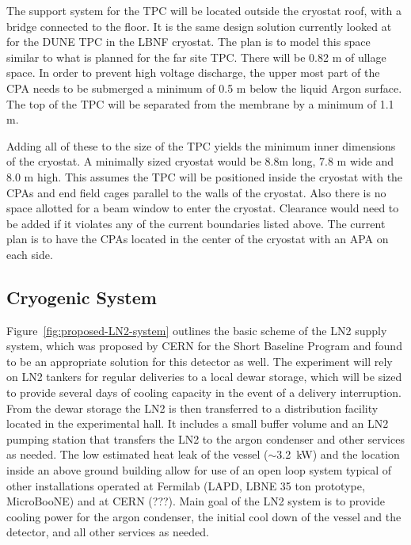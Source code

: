 The support system for the TPC will be located outside the cryostat roof, with a bridge connected to the floor. 
It is the same design solution currently looked at for the DUNE TPC in the LBNF cryostat.  The plan is to model this space similar to what is planned for the far site TPC.  There 
will be 0.82 m of ullage space.  In order to prevent high voltage discharge, the upper most part of the CPA 
needs to be submerged a minimum of 0.5 m below the liquid Argon surface.  The top of the TPC will be 
separated from the membrane by a minimum of 1.1 m.  

Adding all of these to the size of the TPC yields the minimum inner dimensions of the cryostat.  A 
minimally sized cryostat would be 8.8m long, 7.8 m wide and 8.0 m high.  This assumes the TPC will be 
positioned inside the cryostat with the CPAs and end field cages parallel to the walls of the cryostat.  Also 
there is no space allotted for a beam window to enter the cryostat.  Clearance would need to be added if 
it violates any of the current boundaries listed above.  
The current plan is to have the CPAs located in the center of the cryostat with an APA on each side.    

\subsection{Cryogenic System}

Figure~\ref{fig:proposed-LN2-system} outlines the basic scheme of the LN2 supply system, which was 
proposed by CERN for the Short Baseline Program and found to be an appropriate solution for this 
detector as well. The experiment will rely on LN2 tankers for regular deliveries to a local dewar storage, 
which will be sized to provide several days of cooling capacity in the event of a delivery interruption. 
From the dewar storage the LN2 is then transferred to a distribution facility located in the experimental 
hall. It includes a small buffer volume and an LN2 pumping station that transfers the LN2 to the argon 
condenser and other services as needed. The low estimated heat leak of the vessel ($\sim$3.2~kW) and the 
location inside an above ground building allow for use of an open loop system typical of other 
installations operated at Fermilab (LAPD, LBNE 35 ton prototype, MicroBooNE) and at CERN (???). 
Main goal of the LN2 system is to provide cooling power for the argon condenser, the initial cool down of 
the vessel and the detector, and all other services as needed.

